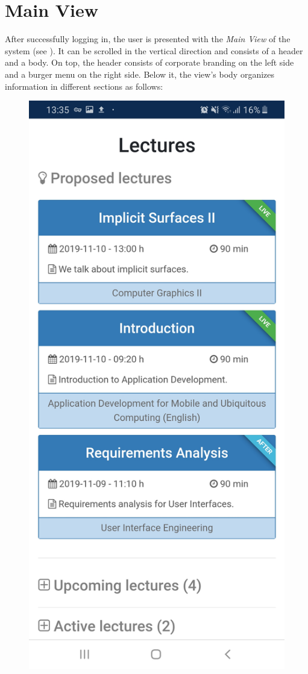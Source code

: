 \section{Main View}
\label{section:soa:mainview}
After successfully logging in, the user is presented with the \emph{Main View} of the system (see ).
It can be scrolled in the vertical direction and consists of a header and a body. On top, the header consists of corporate branding on the left side and a burger menu on the right side. Below it, the view's body organizes information in different sections as follows:

\begin{figure}
	\centering
	\begin{minipage}[t]{.5\textwidth}
		\centering
		\includegraphics[width=0.95\linewidth]{screenshots/main_view_1.jpg}

\end{minipage}
\end{figure}

